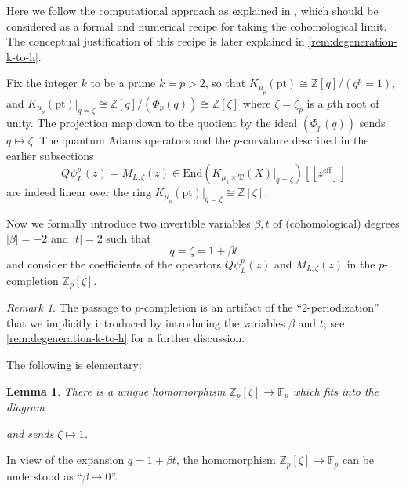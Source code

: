 \documentclass[reqno]{amsart}
\numberwithin{equation}{section}
\numberwithin{equation}{section}
\numberwithin{equation}{section}
\newtheorem{lemma}[thm]{Lemma}
\theoremstyle{definition}
\theoremstyle{remark}
\theoremstyle{remark}
\newtheorem{rem}[thm]{Remark}
\begin{document}
Here we follow the computational approach as explained in \cite[Section 5.1, 5.2]{koroteev-smirnov}, which should be considered as a formal and numerical recipe for taking the cohomological limit. The conceptual justification of this recipe is later explained in \cref{rem:degeneration-k-to-h}.


Fix the integer $k$ to be a prime $k=p  >2$, so that $K_{\mu_p}(\mathrm{pt} ) \cong \mathbb{Z}[q]/(q^p=1)$, and $K_{\mu_p}(\mathrm{pt})|_{q=\zeta} \cong \mathbb{Z}[q]/(\Phi_p(q)) \cong \mathbb{Z}[\zeta]$ where $\zeta = \zeta_p$ is a $p$th root of unity. The projection map down to the quotient by the ideal $(\Phi_p(q))$ sends $q \mapsto \zeta$. The quantum Adams operators and the $p$-curvature described in the earlier subsections
\begin{equation}
    Q\psi^p_L (z) = M_{L, \zeta}(z) \in \mathrm{End}(K_{\mu_k \times \mathbf{T}} (X)|_{q=\zeta} ) [\![z^{\mathrm{eff}}]\!]
\end{equation}
are indeed linear over the ring $K_{\mu_p}(\mathrm{pt})|_{q=\zeta} \cong \mathbb{Z}[\zeta]$.

Now we formally introduce two invertible variables $\beta, t$ of (cohomological) degrees $|\beta|=-2$ and $|t|=2$ such that 
\begin{equation}
    q = \zeta = 1 + \beta t 
\end{equation}
and consider the coefficients of the opeartors $Q\psi^p_L(z)$ and $M_{L, \zeta}(z)$ in the $p$-completion $\mathbb{Z}_p[\zeta]$. 

\begin{rem}
    The passage to $p$-completion is  an artifact of the  ``2-periodization'' that we implicitly introduced by introducing the variables $\beta$ and $t$; see \cref{rem:degeneration-k-to-h} for a further discussion.
\end{rem}

The following is elementary:
\begin{lemma}
    
    There is a unique homomorphism $\mathbb{Z}_p[\zeta] \to \mathbb{F}_p$ which fits into the diagram

    \begin{center}
    \end{center}
    and sends $\zeta \mapsto 1$.
\end{lemma}
In view of the expansion $q = 1 + \beta t$, the homomorphism $\mathbb{Z}_p[\zeta] \to \mathbb{F}_p$ can be understood as ``$ \beta \mapsto 0$''.
\end{document}
